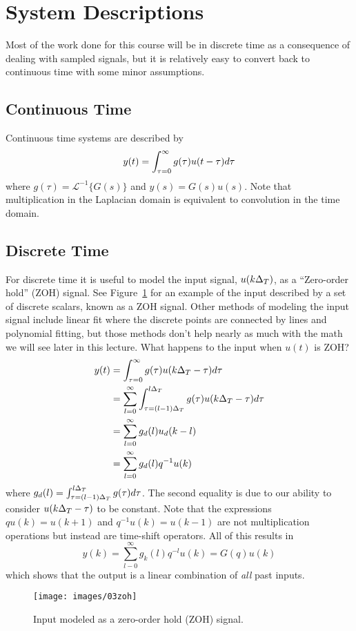 \mainmatter%
\setcounter{page}{1}

\lectureseries[\course]{\course}

\date{October 1, 2009}

\setaddress%

\setcounter{lecture}{2}
\setcounter{chapter}{2}


\section{System Descriptions}
Most of the work done for this course will be in discrete time as a consequence of dealing with sampled signals, but it is relatively easy to convert back to continuous time with some minor assumptions.

\subsection{Continuous Time}
Continuous time systems are described by
$$y(t) = \int_{\tau=0}^\infty g(\tau)u(t-\tau)d\tau$$
where $g(\tau)=\mathcal{L}^{-1}\lbrace G(s)\rbrace$ and $y(s)=G(s)u(s)$.
Note that multiplication in the Laplacian domain is equivalent to convolution in the time domain.

\subsection{Discrete Time}
For discrete time it is useful to model the input signal, $u(k\Delta_T)$, as a ``Zero-order hold'' (ZOH) signal.
See Figure~\ref{fig:03zoh} for an example of the input described by a set of discrete scalars, known as a ZOH signal.
Other methods of modeling the input signal include linear fit where the discrete points are connected by lines and polynomial fitting, but those methods don't help nearly as much with the math we will see later in this lecture.
What happens to the input when $u(t)$ is ZOH\@?
\begin{align*}
y(t) &= \int_{\tau=0}^\infty g(\tau)u(k\Delta_T -\tau)d\tau \\
&= \sum_{l=0}^\infty \int_{\tau=(l-1)\Delta_T}^{l\Delta_T}g(\tau)u(k\Delta_T -\tau)d\tau \\
&= \sum_{l=0}^\infty g_d(l)u_d(k-l) \\
&= \sum_{l=0}^\infty g_d(l)q^{-1}u(k)
\end{align*}
where $g_d(l)=\int_{\tau=(l-1)\Delta_T}^{l\Delta_T}g(\tau)d\tau$.
The second equality is due to our ability to consider $u(k\Delta_T -\tau)$ to be constant.
Note that the expressions $qu(k) = u(k+1)$ and $q^{-1}u(k)=u(k-1)$ are not multiplication operations but instead are time-shift operators.
All of this results in
$$y(k) = \sum_{l-0}^\infty g_k(l)q^{-l}u(k) = G(q)u(k)$$
which shows that the output is a linear combination of \textit{all} past inputs.
\begin{figure}[ht!]
\centering
\texttt{[image: images/03zoh]}
\caption{Input modeled as a zero-order hold (ZOH) signal.}
\label{fig:03zoh}
\end{figure}


